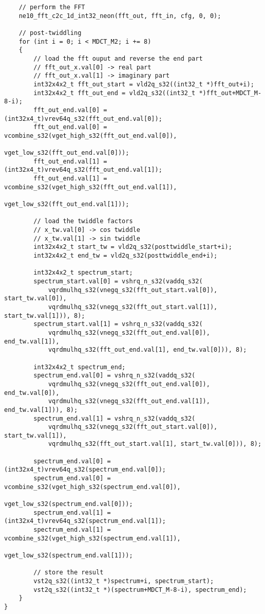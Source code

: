 \documentclass{article}
\begin{document}
\begin{lstlisting}
    // perform the FFT
    ne10_fft_c2c_1d_int32_neon(fft_out, fft_in, cfg, 0, 0);

    // post-twiddling
    for (int i = 0; i < MDCT_M2; i += 8)
    {
        // load the fft ouput and reverse the end part
        // fft_out_x.val[0] -> real part
        // fft_out_x.val[1] -> imaginary part
        int32x4x2_t fft_out_start = vld2q_s32((int32_t *)fft_out+i);
        int32x4x2_t fft_out_end = vld2q_s32((int32_t *)fft_out+MDCT_M-8-i);
        fft_out_end.val[0] = (int32x4_t)vrev64q_s32(fft_out_end.val[0]);
        fft_out_end.val[0] = vcombine_s32(vget_high_s32(fft_out_end.val[0]),
                                          vget_low_s32(fft_out_end.val[0]));
        fft_out_end.val[1] = (int32x4_t)vrev64q_s32(fft_out_end.val[1]);
        fft_out_end.val[1] = vcombine_s32(vget_high_s32(fft_out_end.val[1]),
                                          vget_low_s32(fft_out_end.val[1]));

        // load the twiddle factors
        // x_tw.val[0] -> cos twiddle
        // x_tw.val[1] -> sin twiddle
        int32x4x2_t start_tw = vld2q_s32(posttwiddle_start+i);
        int32x4x2_t end_tw = vld2q_s32(posttwiddle_end+i);

        int32x4x2_t spectrum_start;
        spectrum_start.val[0] = vshrq_n_s32(vaddq_s32(
            vqrdmulhq_s32(vnegq_s32(fft_out_start.val[0]), start_tw.val[0]),
            vqrdmulhq_s32(vnegq_s32(fft_out_start.val[1]), start_tw.val[1])), 8);
        spectrum_start.val[1] = vshrq_n_s32(vaddq_s32(
            vqrdmulhq_s32(vnegq_s32(fft_out_end.val[0]), end_tw.val[1]),
            vqrdmulhq_s32(fft_out_end.val[1], end_tw.val[0])), 8);

        int32x4x2_t spectrum_end;
        spectrum_end.val[0] = vshrq_n_s32(vaddq_s32(
            vqrdmulhq_s32(vnegq_s32(fft_out_end.val[0]), end_tw.val[0]),
            vqrdmulhq_s32(vnegq_s32(fft_out_end.val[1]), end_tw.val[1])), 8);
        spectrum_end.val[1] = vshrq_n_s32(vaddq_s32(
            vqrdmulhq_s32(vnegq_s32(fft_out_start.val[0]), start_tw.val[1]),
            vqrdmulhq_s32(fft_out_start.val[1], start_tw.val[0])), 8);

        spectrum_end.val[0] = (int32x4_t)vrev64q_s32(spectrum_end.val[0]);
        spectrum_end.val[0] = vcombine_s32(vget_high_s32(spectrum_end.val[0]),
                                           vget_low_s32(spectrum_end.val[0]));
        spectrum_end.val[1] = (int32x4_t)vrev64q_s32(spectrum_end.val[1]);
        spectrum_end.val[1] = vcombine_s32(vget_high_s32(spectrum_end.val[1]),
                                           vget_low_s32(spectrum_end.val[1]));

        // store the result
        vst2q_s32((int32_t *)spectrum+i, spectrum_start);
        vst2q_s32((int32_t *)(spectrum+MDCT_M-8-i), spectrum_end);
    }
}
\end{lstlisting}
\end{document}
